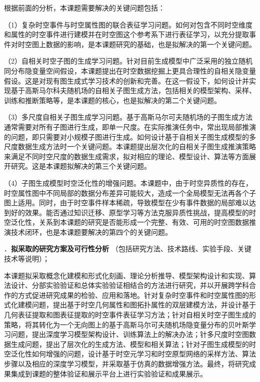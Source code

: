 \documentclass[12pt,UTF8,AutoFakeBold=2,a4paper]{ctexart} %
\newcommand{\sihao}{\fontsize{14pt}{\baselineskip}\selectfont}
\begin{document}
根据前面的分析，本课题需要解决的关键问题包括：

（1）复杂时空事件与时空属性图的联合表征学习问题。如何对包含不同时空维度和属性的时空事件进行建模并在时空图这个参考系下进行表征学习，以充分提取事件对时空图上数据的影响，是本课题研究的基础，也是拟解决的第一个关键问题。

（2）自相关时空子图的生成学习问题。针对目前生成模型中广泛采用的独立随机同分布隐变量空间假设，本课题提出在时空数据挖掘上更具合理性的自相关隐变量假设。这是对现有图生成式学习技术的创新和完善。在这一假设下，如何设计并实现基于高斯马尔科夫随机场的自相关子图生成方法，包括相关的模型架构、采样、训练和推断策略等，是本课题的核心，也是拟解决的第二个关键问题。

（3）多尺度自相关子图生成学习问题。基于高斯马尔可夫随机场的子图生成方法通常需要对所有子图进行生成，即单一尺度。在实际推演任务中，常出现局部推演的问题，即只需要对小规模子图进行生成。如何设计基于自相关子图生成模型的多尺度数据生成方法时一个关键问题。本课题提出层次化的自相关子图生成推演策略来满足不同时空尺度的数据生成需求，拟对相应的理论、模型设计、算法等方面展开研究。这是本课题拟解决的第三个关键问题。

（4）子图生成模型时空泛化性的增强问题。本课题中，由于时空异质性的存在，时空属性图中不同局部的数据分布差异可能较大，造成一个全局模型无法再各个子图上适用。同时，由于时空事件样本稀疏，导致模型在少有事件数据的局部难以达到好的效果。能否通过知识迁移、原型学习等方法克服异质性挑战，提高模型的时空泛化性，关系到本课题的研究是否能形成一个完整、有效、可用的时空图数据推演技术闭环，也是本课题要解决的第四个的关键问题。



\vspace{10pt}
{\sihao \color{MsBlue} ．{\bfseries 拟采取的研究方案及可行性分析} （包括研究方法、技术路线、实验手段、关键技术等说明）；}

本课题拟采取概念化建模和形式化刻画、理论分析推导、模型架构设计和实现、算法设计、分部实验验证和总体实验验证相结合的方法进行研究，并以开展跨学科合作的方式促进研究成果的检验、应用和落地。针对复杂时空事件和时空属性图的形式化建模问题，提出基于时空几何属性和图拓扑属性的双层建模方法，并设计基于几何表征提取和图表征提取的时空事件表征学习方法；针对自相关时空子图生成的策略，将其转化为一个无向图上的基于高斯马尔可夫随机场隐变量分布的贝叶斯学习问题，提出深度学习模型架构设计、训练算法上的解决办法；针多尺度时空图数据生成问题，提出了层次化的生成方法、模型和相关算法；针对子图生成模型的时空泛化性如何增强的问题，设计基于时空元学习和时空原型网络的采样方法、算法步骤以及相应的深度学习模型，并采取基于仿真的数据增强方法。最终，将研究成果集成到课题的整体验证和展示平台上进行实验验证和成果展示。  
\end{document}
